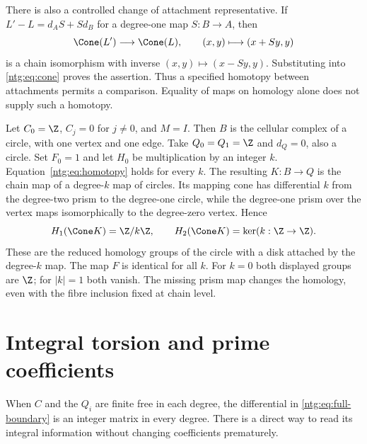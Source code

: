 There is also a controlled change of attachment representative. If
$L'-L=d_AS+Sd_B$ for a degree-one map $S:B\to A$, then
\[
 \Cone(L')\longrightarrow\Cone(L),\qquad (x,y)\longmapsto(x+Sy,y)
\]
is a chain isomorphism with inverse $(x,y)\mapsto(x-Sy,y)$.
Substituting into \eqref{ntg:eq:cone} proves the assertion. Thus a
specified homotopy between attachments permits a comparison. Equality
of maps on homology alone does not supply such a homotopy.

\begin{example}\label{ntg:ex:missing-H}
Let $C_0=\Z$, $C_j=0$ for $j\ne0$, and $M=I$. Then $B$ is the
cellular complex of a circle, with one vertex and one edge.
Take $Q_0=Q_1=\Z$ and $d_Q=0$, also a circle. Set $F_0=1$ and
let $H_0$ be multiplication by an integer $k$.
Equation~\eqref{ntg:eq:homotopy} holds for every $k$. The resulting
$K:B\to Q$ is the chain map of a degree-$k$ map of circles.
Its mapping cone has differential $k$ from the degree-two prism to
the degree-one circle, while the degree-one prism over the vertex
maps isomorphically to the degree-zero vertex. Hence
\[
 H_1(\Cone K)=\Z/k\Z,\qquad
 H_2(\Cone K)=\ker(k:\Z\to\Z).
\]
These are the reduced homology groups of the circle with a disk
attached by the degree-$k$ map. The map $F$ is identical for all $k$.
For $k=0$ both displayed groups are $\Z$; for $|k|=1$ both vanish.
The missing prism map changes the homology, even with the fibre
inclusion fixed at chain level.
\end{example}

\section{Integral torsion and prime coefficients}\label{ntg:sec:torsion}

When $C$ and the $Q_i$ are finite free in each degree, the differential
in \eqref{ntg:eq:full-boundary} is an integer matrix in every degree.
There is a direct way to read its integral information without changing
coefficients prematurely.

